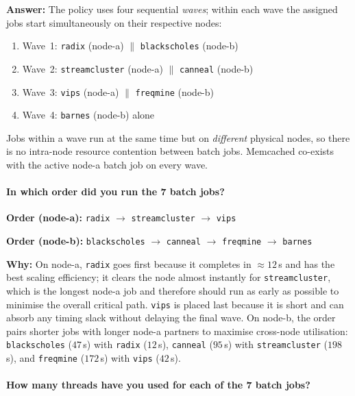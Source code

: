 \textbf{Answer:}
The policy uses four sequential \emph{waves}; within each wave the assigned
jobs start simultaneously on their respective nodes:

\begin{enumerate}
  \item Wave~1: \texttt{radix} (node-a) $\|$ \texttt{blackscholes} (node-b)
  \item Wave~2: \texttt{streamcluster} (node-a) $\|$ \texttt{canneal} (node-b)
  \item Wave~3: \texttt{vips} (node-a) $\|$ \texttt{freqmine} (node-b)
  \item Wave~4: \texttt{barnes} (node-b) alone
\end{enumerate}

Jobs within a wave run at the same time but on \emph{different} physical
nodes, so there is no intra-node resource contention between batch jobs.
Memcached co-exists with the active node-a batch job on every wave.

\paragraph{In which order did you run the 7 batch jobs?}

\textbf{Order (node-a):} \texttt{radix} $\to$ \texttt{streamcluster} $\to$ \texttt{vips}

\textbf{Order (node-b):} \texttt{blackscholes} $\to$ \texttt{canneal} $\to$ \texttt{freqmine} $\to$ \texttt{barnes}

\textbf{Why:}
On node-a, \texttt{radix} goes first because it completes in ${\approx}12$\,s
and has the best scaling efficiency; it clears the node almost instantly for
\texttt{streamcluster}, which is the longest node-a job and therefore
should run as early as possible to minimise the overall critical path.
\texttt{vips} is placed last because it is short and can absorb any timing
slack without delaying the final wave.
On node-b, the order pairs shorter jobs with longer node-a partners to
maximise cross-node utilisation: \texttt{blackscholes} ($47$\,s) with
\texttt{radix} ($12$\,s), \texttt{canneal} ($95$\,s) with
\texttt{streamcluster} ($198$\,s), and \texttt{freqmine} ($172$\,s) with
\texttt{vips} ($42$\,s).

\paragraph{How many threads have you used for each of the 7 batch jobs?}

